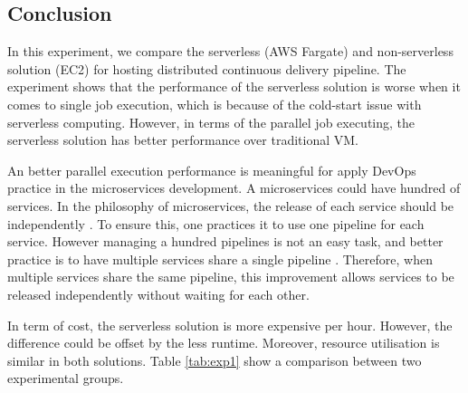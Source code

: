 \subsection{Conclusion}
In this experiment, we compare the serverless (AWS Fargate) and non-serverless solution (EC2) for hosting distributed continuous delivery pipeline. The experiment shows that the performance of the serverless solution is worse when it comes to single job execution, which is because of the cold-start issue with serverless computing. However, in terms of the parallel job executing, the serverless solution has better performance over traditional VM. 
\par
\label{micros}
An better parallel execution performance is meaningful for apply DevOps practice in the microservices development. A microservices could have hundred of services. In the philosophy of microservices, the release of each service should be independently \cite{dehghani2018break}. To ensure this, one practices it to use one pipeline for each service. However managing a hundred pipelines is not an easy task, and better practice is to have multiple services share a single pipeline \cite{HowtoSca9:online}. Therefore, when multiple services share the same pipeline, this improvement allows services to be released independently without waiting for each other.
\par
In term of cost, the serverless solution is more expensive per hour. However, the difference could be offset by the less runtime. Moreover, resource utilisation is similar in both solutions. Table \ref{tab:exp1} show a comparison between two experimental groups.
